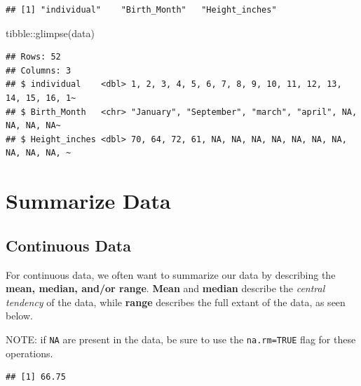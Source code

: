 \documentclass[
]{book}
\newenvironment{Shaded}{\begin{snugshade}}{\end{snugshade}}
\newcommand{\AttributeTok}[1]{\textcolor[rgb]{0.77,0.63,0.00}{#1}}
\newcommand{\FunctionTok}[1]{\textcolor[rgb]{0.00,0.00,0.00}{#1}}
\newcommand{\NormalTok}[1]{#1}
\newcommand{\SpecialCharTok}[1]{\textcolor[rgb]{0.00,0.00,0.00}{#1}}
\begin{document}
\begin{verbatim}
## [1] "individual"    "Birth_Month"   "Height_inches"
\end{verbatim}

\begin{Shaded}
\begin{Highlighting}[]
\NormalTok{tibble}\SpecialCharTok{::}\FunctionTok{glimpse}\NormalTok{(data)}
\end{Highlighting}
\end{Shaded}

\begin{verbatim}
## Rows: 52
## Columns: 3
## $ individual    <dbl> 1, 2, 3, 4, 5, 6, 7, 8, 9, 10, 11, 12, 13, 14, 15, 16, 1~
## $ Birth_Month   <chr> "January", "September", "march", "april", NA, NA, NA, NA~
## $ Height_inches <dbl> 70, 64, 72, 61, NA, NA, NA, NA, NA, NA, NA, NA, NA, NA, ~
\end{verbatim}

\hypertarget{summarize-data-1}{%
\chapter*{Summarize Data}\label{summarize-data-1}}

\hypertarget{continuous-data-1}{%
\section*{Continuous Data}\label{continuous-data-1}}

For continuous data, we often want to summarize our data by describing the \textbf{mean, median, and/or range}. \textbf{Mean} and \textbf{median} describe the \emph{central tendency} of the data, while \textbf{range} describes the full extant of the data, as seen below.

NOTE: if \texttt{NA} are present in the data, be sure to use the \texttt{na.rm=TRUE} flag for these operations.

\begin{Shaded}
\end{Shaded}

\begin{verbatim}
## [1] 66.75
\end{verbatim}
\end{document}
